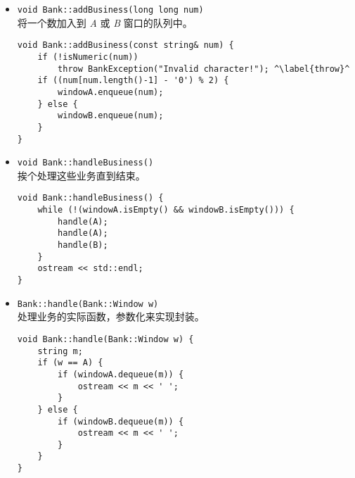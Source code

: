 {\begin{itemize}
      \item \lstinline{void Bank::addBusiness(long long num)} \\
            将一个数加入到 \textsl{A} 或 \textsl{B} 窗口的队列中。
\begin{lstlisting}[escapechar=^,]
void Bank::addBusiness(const string& num) {
    if (!isNumeric(num))
        throw BankException("Invalid character!"); ^\label{throw}^
    if ((num[num.length()-1] - '0') % 2) {
        windowA.enqueue(num);
    } else {
        windowB.enqueue(num);
    }
}
\end{lstlisting}
      \item \lstinline{void Bank::handleBusiness()}\\
            挨个处理这些业务直到结束。
\begin{lstlisting}
void Bank::handleBusiness() {
    while (!(windowA.isEmpty() && windowB.isEmpty())) {
        handle(A);
        handle(A);
        handle(B);
    }
    ostream << std::endl;
}
\end{lstlisting}
      \item \lstinline{Bank::handle(Bank::Window w)}\\
            处理业务的实际函数，参数化来实现封装。
\begin{lstlisting}
void Bank::handle(Bank::Window w) {
    string m;
    if (w == A) {
        if (windowA.dequeue(m)) {
            ostream << m << ' ';
        }
    } else {
        if (windowB.dequeue(m)) {
            ostream << m << ' ';
        }
    }
}
\end{lstlisting}
\end{itemize}

}